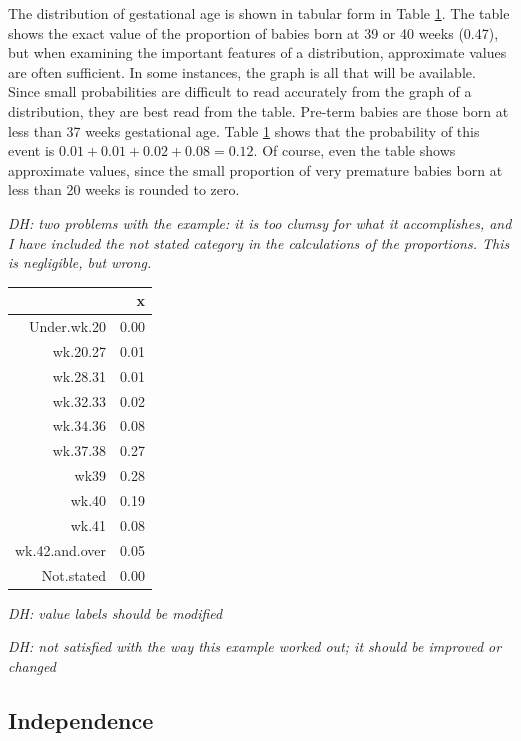 \begin{doublespace}

The distribution of gestational age is shown in tabular form in Table \ref{gestageMarginalDistTable}.  The table shows the exact value of the proportion of babies born at 39 or 40 weeks (0.47), but when examining the important features of a distribution, approximate values are often sufficient.  In some instances, the graph is all that will be available.  Since small probabilities are difficult to read accurately from the graph of a distribution, they are best read from the table.  Pre-term babies are those born at less than 37 weeks gestational age.  Table \ref{gestageMarginalDistTable} shows that the probability of this event is $0.01 + 0.01 + 0.02 + 0.08 = 0.12$.  Of course, even the table shows approximate values, since the small proportion of very premature babies born at less than 20 weeks is rounded to zero.

\textit{DH: two problems with the example: it is too clumsy for what it accomplishes, and I have  included the not stated category in the calculations of the proportions.  This is negligible, but wrong.}

\begin{table}[ht]
\label{gestageMarginalDistTable}
\centering
\begin{tabular}{rr}
  \hline
 & x \\ 
  \hline
Under.wk.20 & 0.00 \\ 
  wk.20.27 & 0.01 \\ 
  wk.28.31 & 0.01 \\ 
  wk.32.33 & 0.02 \\ 
  wk.34.36 & 0.08 \\ 
  wk.37.38 & 0.27 \\ 
  wk39 & 0.28 \\ 
  wk.40 & 0.19 \\ 
  wk.41 & 0.08 \\ 
  wk.42.and.over & 0.05 \\ 
  Not.stated & 0.00 \\ 
   \hline
\end{tabular}
\end{table}

\textit{DH: value labels should be modified}

\textit{DH: not satisfied with the way this example worked out; it should be improved or changed}

\subsection{Independence}
\label{probabilityIndependence}


\end{doublespace}
